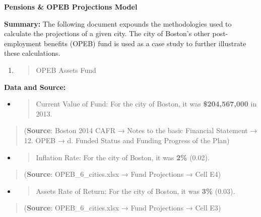 \documentclass[
]{article}
\author{}
\date{}
\begin{document}
\textbf{Pensions \& OPEB Projections Model}

\textbf{{Summary:}} The following document expounds the methodologies
used to calculate the projections of a given city. The city of Boston's
other post-employment benefits (OPEB) fund is used as a case study to
further illustrate these calculations.

\begin{enumerate}
\def\labelenumi{\Roman{enumi}.}
\item
  \begin{quote}
  OPEB Assets Fund
  \end{quote}
\end{enumerate}

\textbf{{Data and Source:}}

\begin{itemize}
\item
  \begin{quote}
  Current Value of Fund: For the city of Boston, it was
  \textbf{\$204,567,000} in 2013.
  \end{quote}
\end{itemize}

\begin{quote}
(\textbf{{Source}}: Boston 2014 CAFR → Notes to the basic Financial
Statement → 12. OPEB → d. Funded Status and Funding Progress of the
Plan)
\end{quote}

\begin{itemize}
\item
  \begin{quote}
  Inflation Rate: For the city of Boston, it was \textbf{2\%} (0.02).
  \end{quote}
\end{itemize}

\begin{quote}
(\textbf{{Source}}: OPEB\_6\_cities.xlsx → Fund Projections → Cell E4)
\end{quote}

\begin{itemize}
\item
  \begin{quote}
  Assets Rate of Return: For the city of Boston, it was \textbf{3\%}
  (0.03).
  \end{quote}
\end{itemize}

\begin{quote}
(\textbf{{Source}}: OPEB\_6\_cities.xlsx → Fund Projections → Cell E3)
\end{quote}
\end{document}
